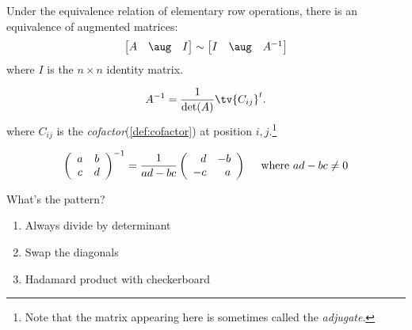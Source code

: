 \begin{proposition}

Under the equivalence relation of elementary row operations, there is an
equivalence of augmented matrices:
\begin{align*}
\begin{bmatrix}
A &\aug& I
\end{bmatrix}
\sim
\begin{bmatrix}
I &\aug& A^{-1}
\end{bmatrix}
\end{align*} where \(I\) is the \(n\times n\) identity matrix.

\end{proposition}

\begin{proposition}

\begin{align*}  
A^{-1} = {1\over \det(A)} \tv{C_{ij}}^t
.\end{align*} where \(C_{ij}\) is the
\emph{cofactor}(\cref{def:cofactor}) at position \(i,j\).\footnote{Note
  that the matrix appearing here is sometimes called the
  \emph{adjugate}.}

\end{proposition}

\begin{example}

\begin{align*}
\left(\begin{array}{cc} 
a& b \\ 
c& d 
\end{array}\right)^{-1} 
= 
{1 \over a d - b c} 
\left(\begin{array}{rr} 
d  & -b \\ 
-c & a 
\end{array}\right)
\quad 
\text{ where } ad-bc \ne 0
\end{align*}

What's the pattern?

\begin{enumerate}
\def\labelenumi{\arabic{enumi}.}
\tightlist
\item
  Always divide by determinant
\item
  Swap the diagonals
\item
  Hadamard product with checkerboard
\end{enumerate}

\end{example}

